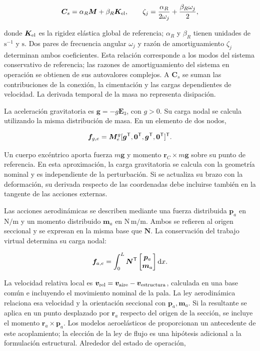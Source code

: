 \begin{equation}
\bm C_s=\alpha_R\bm M+\beta_R\bm K_{\rm el},\qquad
\zeta_j=\frac{\alpha_R}{2\omega_j}+\frac{\beta_R\omega_j}{2},
\end{equation}

donde $\bm K_{\rm el}$ es la rigidez elástica global de referencia; $\alpha_R$ y $\beta_R$ tienen unidades de $\mathrm{s^{-1}}$ y $\mathrm{s}$. Dos pares de frecuencia angular $\omega_j$ y razón de amortiguamiento $\zeta_j$ determinan ambos coeficientes. Esta relación corresponde a los modos del sistema conservativo de referencia; las razones de amortiguamiento del sistema en operación se obtienen de sus autovalores complejos. A $\bm C_s$ se suman las contribuciones de la conexión, la cimentación y las cargas dependientes de velocidad. La derivada temporal de la masa no representa disipación.

La aceleración gravitatoria es $\bm g=-g\bm E_3$, con $g>0$. Su carga nodal se calcula utilizando la misma distribución de masa. En un elemento de dos nodos,

\begin{equation}
\bm f_{g,e}=\bm M_e^g[\bm g^\mathsf T,\bm0^\mathsf T,\bm g^\mathsf T,\bm0^\mathsf T]^\mathsf T.
\end{equation}

Un cuerpo excéntrico aporta fuerza $m\bm g$ y momento $\bm r_C\times m\bm g$ sobre su punto de referencia. En esta aproximación, la carga gravitatoria se calcula con la geometría nominal y es independiente de la perturbación. Si se actualiza su brazo con la deformación, su derivada respecto de las coordenadas debe incluirse también en la tangente de las acciones externas.

Las acciones aerodinámicas se describen mediante una fuerza distribuida $\bm p_a$ en $\mathrm{N/m}$ y un momento distribuido $\bm m_a$ en $\mathrm{N\,m/m}$. Ambos se refieren al origen seccional y se expresan en la misma base que $\bm N$. La conservación del trabajo virtual determina su carga nodal:

\begin{equation}
\bm f_{a,e}=\int_0^L\bm N^\mathsf T
\begin{bmatrix}\bm p_a\\\bm m_a\end{bmatrix}\mathrm d x.
\end{equation}

La velocidad relativa local es $\bm v_{\rm rel}=\bm v_{\rm aire}-\bm v_{\rm estructura}$, calculada en una base común e incluyendo el movimiento nominal de la pala. La ley aerodinámica relaciona esa velocidad y la orientación seccional con $\bm p_a,\bm m_a$. Si la resultante se aplica en un punto desplazado por $\bm r_a$ respecto del origen de la sección, se incluye el momento $\bm r_a\times\bm p_a$. Los modelos aeroelásticos de \citet{maza2014} proporcionan un antecedente de este acoplamiento; la elección de la ley de flujo es una hipótesis adicional a la formulación estructural. Alrededor del estado de operación,

